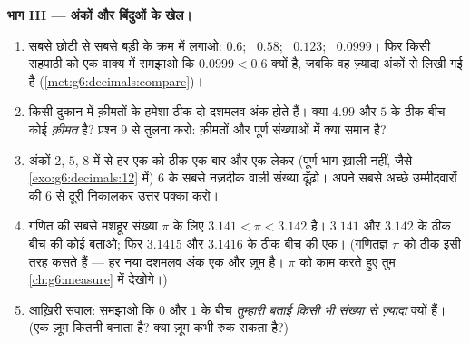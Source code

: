 \begin{problem}
\medskip
\noindent\textbf{भाग III --- अंकों और बिंदुओं के खेल।}
\begin{enumerate}[resume]
  \item सबसे छोटी से सबसे बड़ी के क्रम में लगाओ: $0.6$; \ $0.58$; \
        $0.123$; \ $0.0999$। फिर किसी सहपाठी को एक वाक्य में
        समझाओ कि $0.0999 < 0.6$ क्यों है, जबकि वह ज़्यादा अंकों
        से लिखी गई है (\cref{met:g6:decimals:compare})।
  \item किसी दुकान में क़ीमतों के हमेशा ठीक दो दशमलव अंक होते
        हैं। क्या $4.99$ और $5$ के ठीक बीच कोई \emph{क़ीमत} है?
        प्रश्न 9 से तुलना करो: क़ीमतों और पूर्ण संख्याओं में
        क्या समान है?
  \item अंकों $2$, $5$, $8$ में से हर एक को ठीक एक बार और एक
         लेकर (पूर्ण भाग ख़ाली नहीं, जैसे
        \cref{exo:g6:decimals:12} में) $6$ के सबसे नज़दीक वाली
        संख्या ढूँढ़ो। अपने सबसे अच्छे उम्मीदवारों की $6$ से दूरी
        निकालकर उत्तर पक्का करो।
  \item गणित की सबसे मशहूर संख्या $\pi$ के लिए
        $3.141 < \pi < 3.142$ है। $3.141$ और $3.142$ के ठीक बीच
        की कोई  बताओ; फिर $3.1415$ और $3.1416$ के
        ठीक बीच की एक। (गणितज्ञ $\pi$ को ठीक इसी तरह कसते हैं
        --- हर नया दशमलव अंक एक और ज़ूम है। $\pi$ को काम करते हुए
        तुम \cref{ch:g6:measure} में देखोगे।)
  \item आख़िरी सवाल: समझाओ कि $0$ और $1$ के बीच \emph{तुम्हारी
        बताई किसी भी संख्या से ज़्यादा } क्यों
        हैं। (एक ज़ूम कितनी बनाता है? क्या ज़ूम कभी रुक सकता है?)
\end{enumerate}
\end{problem}
